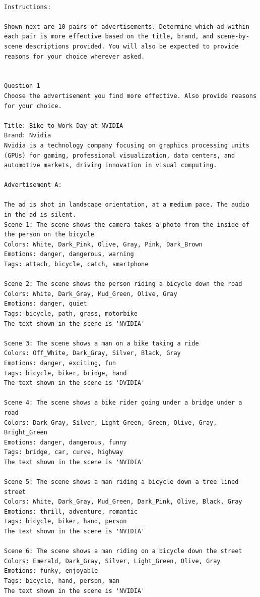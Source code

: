 \begin{lstlisting}[caption={},frame=single,breaklines=true,basicstyle=\tiny, label={lst:form}]

Instructions:

Shown next are 10 pairs of advertisements. Determine which ad within each pair is more effective based on the title, brand, and scene-by-scene descriptions provided. You will also be expected to provide reasons for your choice wherever asked.


Question 1
Choose the advertisement you find more effective. Also provide reasons for your choice.

Title: Bike to Work Day at NVIDIA
Brand: Nvidia
Nvidia is a technology company focusing on graphics processing units (GPUs) for gaming, professional visualization, data centers, and automotive markets, driving innovation in visual computing.

Advertisement A:

The ad is shot in landscape orientation, at a medium pace. The audio in the ad is silent.
Scene 1: The scene shows the camera takes a photo from the inside of the person on the bicycle
Colors: White, Dark_Pink, Olive, Gray, Pink, Dark_Brown
Emotions: danger, dangerous, warning
Tags: attach, bicycle, catch, smartphone

Scene 2: The scene shows the person riding a bicycle down the road
Colors: White, Dark_Gray, Mud_Green, Olive, Gray
Emotions: danger, quiet
Tags: bicycle, path, grass, motorbike
The text shown in the scene is 'NVIDIA' 

Scene 3: The scene shows a man on a bike taking a ride
Colors: Off_White, Dark_Gray, Silver, Black, Gray
Emotions: danger, exciting, fun
Tags: bicycle, biker, bridge, hand
The text shown in the scene is 'DVIDIA' 

Scene 4: The scene shows a bike rider going under a bridge under a road
Colors: Dark_Gray, Silver, Light_Green, Green, Olive, Gray, Bright_Green
Emotions: danger, dangerous, funny
Tags: bridge, car, curve, highway
The text shown in the scene is 'NVIDIA' 

Scene 5: The scene shows a man riding a bicycle down a tree lined street
Colors: White, Dark_Gray, Mud_Green, Dark_Pink, Olive, Black, Gray
Emotions: thrill, adventure, romantic
Tags: bicycle, biker, hand, person
The text shown in the scene is 'NVIDIA' 

Scene 6: The scene shows a man riding on a bicycle down the street
Colors: Emerald, Dark_Gray, Silver, Light_Green, Olive, Gray
Emotions: funky, enjoyable
Tags: bicycle, hand, person, man
The text shown in the scene is 'NVIDIA' 


\end{lstlisting}
